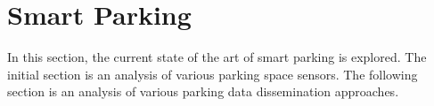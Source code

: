 \section{Smart Parking}
In this section, the current state of the art of smart parking is explored. The initial section is an analysis of various parking space sensors. The following section is an analysis of various parking data dissemination approaches.